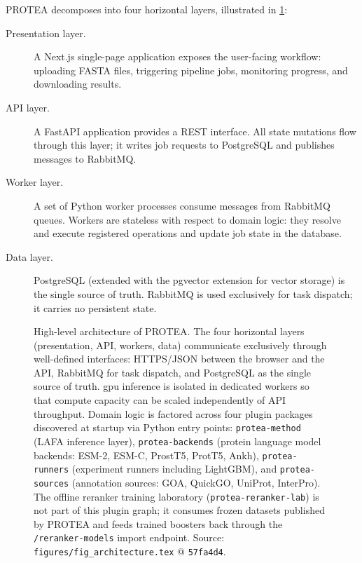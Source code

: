 PROTEA decomposes into four horizontal layers, illustrated in
\cref{fig:architecture}:

\begin{description}
  \item[Presentation layer.] A Next.js single-page application exposes the
    user-facing workflow: uploading FASTA files, triggering pipeline jobs,
    monitoring progress, and downloading results.
  \item[API layer.] A FastAPI application provides a REST interface. All state
    mutations flow through this layer; it writes job requests to PostgreSQL and
    publishes messages to RabbitMQ.
  \item[Worker layer.] A set of Python worker processes consume messages from
    RabbitMQ queues. Workers are stateless with respect to domain logic: they
    resolve and execute registered operations and update job state in the database.
  \item[Data layer.] PostgreSQL (extended with the pgvector extension for vector
    storage) is the single source of truth. RabbitMQ is used exclusively for
    task dispatch; it carries no persistent state.
\end{description}

\begin{figure}[htbp]
  \centering
  \resizebox{\textwidth}{!}{}
  \caption[High-level architecture of PROTEA]{%
    High-level architecture of PROTEA. The four horizontal layers
    (presentation, API, workers, data) communicate exclusively through well-defined
    interfaces: HTTPS/JSON between the browser and the API, RabbitMQ for task
    dispatch, and PostgreSQL as the single source of truth. \gls{gpu} inference is
    isolated in dedicated workers so that compute capacity can be scaled
    independently of API throughput. Domain logic is factored across four plugin
    packages discovered at startup via Python entry points:
    \texttt{protea-method} (LAFA inference layer), \texttt{protea-backends}
    (protein language model backends: ESM-2, ESM-C, ProstT5, ProtT5, Ankh),
    \texttt{protea-runners} (experiment runners including LightGBM), and
    \texttt{protea-sources} (annotation sources: GOA, QuickGO, UniProt, InterPro).
    The offline reranker training laboratory (\texttt{protea-reranker-lab}) is
    not part of this plugin graph; it consumes frozen datasets published by
    PROTEA and feeds trained boosters back through the \texttt{/reranker-models}
    import endpoint.
    Source: \texttt{figures/fig\_architecture.tex} @ \texttt{57fa4d4}.%
  }
  \label{fig:architecture}
\end{figure}

